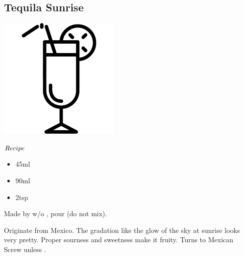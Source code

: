 \subsection{Tequila Sunrise}
\vspace{-7.8mm}
\hspace{43mm}
\includegraphics[scale=.07]{cocktail_glass_tall.png}
\vspace{2.mm}
\begin{itembox}[l]{\boldmath $Recipe$}
\begin{itemize}
\setlength{\parskip}{0cm}
\setlength{\itemsep}{0cm}
\item \teq 45ml
\item \oj 90ml
\item \gs 2tsp
\end{itemize}
\vspace{-4mm}
Made by \build w/o \gs
\hspace{-1mm}, pour \gs (do not mix).
\end{itembox}
Originate from Mexico. The gradation like the glow of the sky at sunrise looks very pretty. Proper sourness and sweetness make it fruity. Turns to Mexican Screw unless \gs
\hspace{-1mm}.
